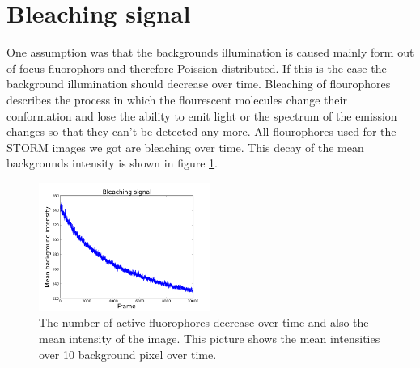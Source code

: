 \section{Bleaching signal}
One assumption was that the backgrounds illumination is caused mainly form out of focus fluorophors and therefore Poission distributed. If this is the case the background illumination should decrease over time. Bleaching of flourophores describes the process in which the flourescent molecules change their conformation and lose the ability to emit light or the spectrum of the emission changes so that they can't be detected any more. All flourophores used for the STORM images we got are bleaching over time. This decay of the mean backgrounds intensity is shown in figure \ref{bleaching}.

\begin{figure}
\centering
\includegraphics[width = 0.5\textwidth]{pictures/bleaching.png}
	\caption{The number of active fluorophores decrease over time and also the mean intensity of the image. This picture shows the mean intensities over 10 background pixel over time. }
	\label{bleaching}
\end{figure}